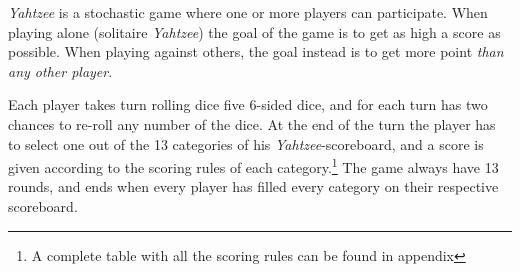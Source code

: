 \emph{Yahtzee} is a stochastic game where one or more players can participate. 
When playing alone (solitaire \emph{Yahtzee}) the goal of the game is to get as high a score as possible. 
When playing against others, the goal instead is to get more point \emph{than any other player}.

Each player takes turn rolling dice five 6-sided dice, and for each turn has two chances to re-roll any number of the dice. At the end of the turn the player has to select one out of the 13 categories of his \emph{Yahtzee}-scoreboard, and a score is given according to the scoring rules of each category.\footnote{A complete table with all the scoring rules can be found in appendix %
}
The game always have 13 rounds, and ends when every player has filled every category on their respective scoreboard.
